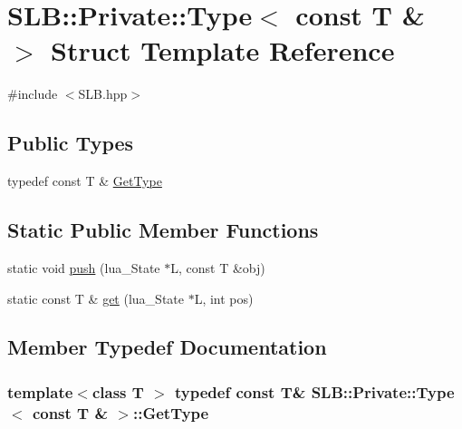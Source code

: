 \hypertarget{structSLB_1_1Private_1_1Type_3_01const_01T_01_6_01_4}{}\section{S\+LB\+:\+:Private\+:\+:Type$<$ const T \& $>$ Struct Template Reference}
\label{structSLB_1_1Private_1_1Type_3_01const_01T_01_6_01_4}


{\ttfamily \#include $<$S\+L\+B.\+hpp$>$}

\subsection*{Public Types}
\begin{DoxyCompactItemize}
\item 
typedef const T \& \hyperlink{structSLB_1_1Private_1_1Type_3_01const_01T_01_6_01_4_a716f43045f0b3643bcf06700d574dda9}{Get\+Type}
\end{DoxyCompactItemize}
\subsection*{Static Public Member Functions}
\begin{DoxyCompactItemize}
\item 
static void \hyperlink{structSLB_1_1Private_1_1Type_3_01const_01T_01_6_01_4_a7805b62b965a2bc5c15a7ed1d41dc59d}{push} (lua\+\_\+\+State $\ast$L, const T \&obj)
\item 
static const T \& \hyperlink{structSLB_1_1Private_1_1Type_3_01const_01T_01_6_01_4_adcc8cddebb89d8c9979fff3ffd58c8d7}{get} (lua\+\_\+\+State $\ast$L, int pos)
\end{DoxyCompactItemize}


\subsection{Member Typedef Documentation}
\subsubsection[{\texorpdfstring{Get\+Type}{GetType}}]{\setlength{\rightskip}{0pt plus 5cm}template$<$class T $>$ typedef const T\& {\bf S\+L\+B\+::\+Private\+::\+Type}$<$ const T \& $>$\+::{\bf Get\+Type}}\hypertarget{structSLB_1_1Private_1_1Type_3_01const_01T_01_6_01_4_a716f43045f0b3643bcf06700d574dda9}{}\label{structSLB_1_1Private_1_1Type_3_01const_01T_01_6_01_4_a716f43045f0b3643bcf06700d574dda9}


